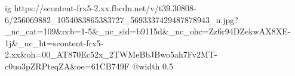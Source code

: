 
 
 
 
 

\ifcmt
  ig https://scontent-frx5-2.xx.fbcdn.net/v/t39.30808-6/256069882_1054083865383727_5693337429487878943_n.jpg?_nc_cat=109&ccb=1-5&_nc_sid=b9115d&_nc_ohc=Zz6r94DZekwAX8XE-1j&_nc_ht=scontent-frx5-2.xx&oh=00_AT870Ec52x_2TWMeBbJBwo5ah7Fv2MT-c0uo3pZRPteqZA&oe=61CB749F
  @width 0.5
\fi
